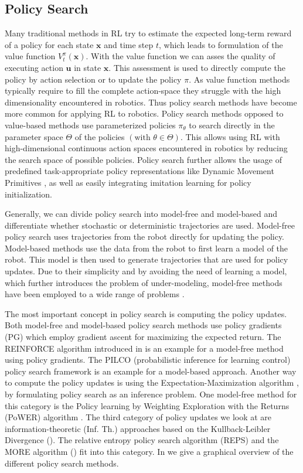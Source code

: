 \subsection{Policy Search}
Many traditional methods in RL try to estimate the
expected long-term reward of a policy for each state $\mathbf{x}$
and time step $t$, which leads to formulation of the value function $V^{\pi}_t(\mathbf{x})$.
With the value function we can asses the quality of executing action
$\mathbf{u}$ in state $\mathbf{x}$. This assessment is used
to directly compute the policy by action selection or to update
the policy $\pi$. As value function methods typically require
to fill the complete action-space they struggle with
the high dimensionality encountered in robotics.
Thus policy search methods have become more common
for applying RL to robotics.
Policy search methods opposed to value-based methods
use parameterized policies $\pi_{\theta}$ to search
directly in the parameter space $\Theta$
of the policies $(\text{with }\theta \in \Theta)$. This allows using RL with
high-dimensional continuous action spaces encountered
in robotics by reducing the search space of possible policies.
Policy search further allows the usage of predefined
task-appropriate policy representations like Dynamic
Movement Primitives \citep{schaal2005learning}, as well
as easily integrating imitation learning
for policy initialization.

Generally, we can divide policy search into model-free and model-based and
differentiate whether stochastic or deterministic trajectories are used.
Model-free policy search uses trajectories from the robot directly
for updating the policy. Model-based methods use the data
from the robot to first learn a model of the robot. This model is then used
to generate trajectories that are used for policy updates.
Due to their simplicity and by avoiding the need of learning a model,
which further introduces the problem of under-modeling,
model-free methods have been employed to a wide range of problems
\citep{deisenroth2013survey}.

The most important concept in policy search is computing the policy updates.
Both model-free and model-based policy search methods use policy
gradients (PG) which employ gradient ascent for maximizing
the expected return.
The REINFORCE algorithm introduced in \citet{williams1992simple}
is an example for a model-free method using policy gradients.
The PILCO (probabilistic inference for learning control)
policy search framework \citep{deisenroth2011pilco}
is an example for a model-based approach.
Another way to compute the policy updates 
is using the Expectation-Maximization algorithm \citep{bishop2006pattern},
by formulating policy
search as an inference problem. One model-free method for this category
is the Policy learning by Weighting Exploration with the Returns (PoWER)
algorithm \citep{kober2011policy}.
The third category of policy updates we look at
are information-theoretic (Inf. Th.) approaches
based on the Kullback-Leibler Divergence ().
The relative entropy policy search algorithm (REPS)
\citep{peters2010relative}
and the MORE algorithm () fit into this category.
In 
we give a graphical overview of the different policy search methods.

